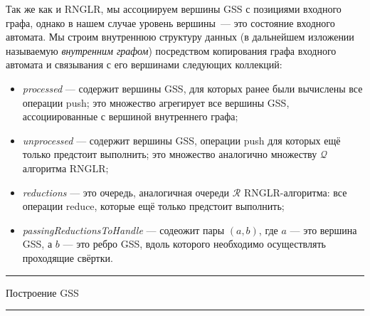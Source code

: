 Так же как и RNGLR, мы ассоциируем вершины GSS с позициями входного графа, однако в нашем случае уровень вершины~--- это состояние входного автомата. Мы строим внутреннюю структуру данных (в дальнейшем изложении называемую \emph{внутренним графом}) посредством копирования графа входного автомата и связывания с его вершинами следующих коллекций:
\begin{itemize}
  \item \emph{processed} --- содержит вершины GSS, для которых ранее были вычислены все операции push; это множество агрегирует все вершины GSS, ассоциированные с вершиной внутреннего графа;
  \item \emph{unprocessed} --- содержит вершины GSS, операции push для которых ещё только предстоит выполнить; это множество аналогично множеству $\mathcal{Q}$ алгоритма RNGLR;
  \item \emph{reductions} --- это очередь, аналогичная очереди $\mathcal{R}$ RNGLR-алгоритма: все операции reduce, которые ещё только предстоит выполнить;
  \item \emph{passingReductionsToHandle} --- содеожит пары $(a,b)$, где $a$ --- это вершина GSS, а $b$ --- это ребро GSS, вдоль которого необходимо осуществлять проходящие свёртки.
\end{itemize}

\begin{listing}[!ht]
\hrule

\begin{algorithmic}[1]
\caption{Построение GSS}
\label{gss_construction}
   
  \Else
    \EndFor
  \EndIf
\EndFunction

    \EndIf
      \EndFor
    \EndIf
  \EndIf
\EndFunction
\end{algorithmic}

\hrule
\end{listing}


